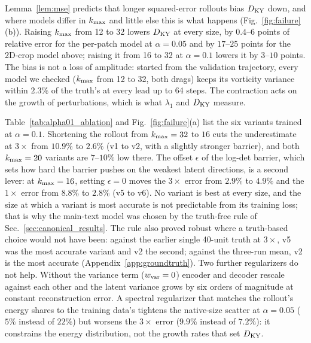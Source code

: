 Lemma~\ref{lem:mse} predicts that longer squared-error rollouts bias
$D_{\mathrm{KY}}$ down, and where models differ in $k_{\max}$ and little else this is
what happens (Fig.~\ref{fig:failure}(b)). Raising $k_{\max}$ from 12 to 32
lowers $D_{\mathrm{KY}}$ at every size, by $0.4$--$6$ points of relative error for the
per-patch model at $\alpha=0.05$ and by $17$--$25$ points for the 2D-crop
model above; raising it from 16 to 32 at $\alpha=0.1$ lowers it by $3$--$10$
points. The bias is not a loss of amplitude: started from the validation
trajectory, every model we checked ($k_{\max}$ from 12 to 32, both drags)
keeps its vorticity variance within $2.3\%$ of the truth's at every lead
up to 64 steps. The contraction acts on the growth of perturbations,
which is what $\lambda_1$ and $D_{\mathrm{KY}}$ measure.

Table~\ref{tab:alpha01_ablation} and Fig.~\ref{fig:failure}(a) list the
six variants trained at $\alpha=0.1$. Shortening the rollout from
$k_{\max}=32$ to $16$ cuts the underestimate at $3\times$ from $10.9\%$ to
$2.6\%$ (v1 to v2, with a slightly stronger barrier), and both $k_{\max}=20$
variants are $7$--$10\%$ low there. The offset $\epsilon$ of the log-det
barrier, which sets how hard the barrier pushes on the weakest latent
directions, is a second lever: at $k_{\max}=16$, setting $\epsilon=0$ moves the
$3\times$ error from $2.9\%$ to $4.9\%$ and the $1\times$ error from $8.8\%$ to
$2.8\%$ (v5 to v6). No variant is best at every size, and the size at
which a variant is most accurate is not predictable from its training
loss; that is why the main-text model was chosen by the truth-free rule
of Sec.~\ref{sec:canonical_results}. The rule also proved robust where
a truth-based choice would not have been: against the earlier single
40-unit truth at $3\times$, v5 was the most accurate variant and v2 the
second; against the three-run mean, v2 is the most accurate
(Appendix~\ref{app:groundtruth}). Two further regularizers do not help.
Without the variance term ($w_{\mathrm{var}}=0$) encoder and decoder rescale against
each other and the latent variance grows by six orders of magnitude at
constant reconstruction error. A spectral regularizer that matches the
rollout's energy shares to the training data's tightens the native-size
scatter at $\alpha=0.05$ ($5\%$ instead of $22\%$) but worsens the $3\times$
error ($9.9\%$ instead of $7.2\%$): it constrains the energy distribution,
not the growth rates that set $D_{\mathrm{KY}}$.

